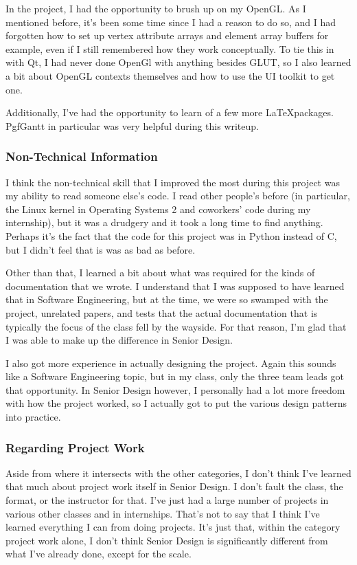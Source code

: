 \documentclass[letterpaper,10pt, onecolumn, draftclsnofoot]{IEEEtran}
\begin{document}
In the project, I had the opportunity to brush up on my OpenGL. As I mentioned before, it's been some time since I had a reason to do so, and I had forgotten how to set up vertex attribute arrays and element array buffers for example, even if I still remembered how they work conceptually. To tie this in with Qt, I had never done OpenGl with anything besides GLUT, so I also learned a bit about OpenGL contexts themselves and how to use the UI toolkit to get one.

Additionally, I've had the opportunity to learn of a few more \LaTeX packages. PgfGantt in particular was very helpful during this writeup. 

\subsubsection{Non-Technical Information}
I think the non-technical skill that I improved the most during this project was my ability to read someone else's code. I read other people's before (in particular, the Linux kernel in Operating Systems 2 and coworkers' code during my internship), but it was a drudgery and it took a long time to find anything. Perhaps it's the fact that the code for this project was in Python instead of C, but I didn't feel that is was as bad as before.

Other than that, I learned a bit about what was required for the kinds of documentation that we wrote. I understand that I was supposed to have learned that in Software Engineering, but at the time, we were so swamped with the project, unrelated papers, and tests that the actual documentation that is typically the focus of the class fell by the wayside. For that reason, I'm glad that I was able to make up the difference in Senior Design.

I also got more experience in actually designing the project. Again this sounds like a Software Engineering topic, but in my class, only the three team leads got that opportunity. In Senior Design however, I personally had a lot more freedom with how the project worked, so I actually got to put the various design patterns into practice.

\subsubsection{Regarding Project Work}
Aside from where it intersects with the other categories, I don't think I've learned that much about project work itself in Senior Design. I don't fault the class, the format, or the instructor for that. I've just had a large number of projects in various other classes and in internships. That's not to say that I think I've learned everything I can from doing projects. It's just that, within the category project work alone, I don't think Senior Design is significantly different from what I've already done, except for the scale.
\end{document}

